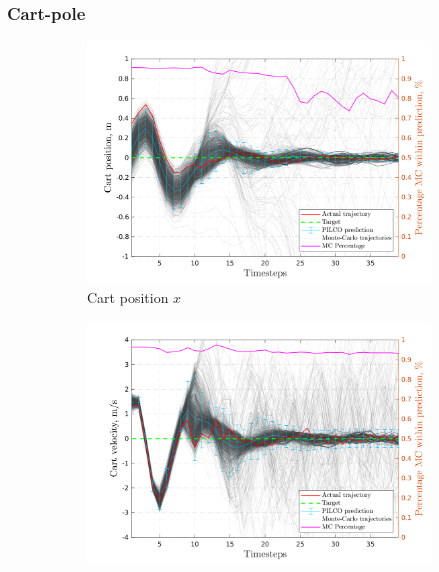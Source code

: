 \subsubsection{Cart-pole}
 \begin{figure}[htp!]    
   \begin{subfigure}[b]{1\linewidth}
    \centering
    \includegraphics[height=0.4\textheight,width=1\textwidth]{Chapter3/Figures/cp_MC_rollout_Ep_15_Dim_1.png} 
    \caption{Cart position $x$} 
    \label{Fig:Re-cp-cart-position} 
  \end{subfigure} 
  \begin{subfigure}[b]{1\linewidth}
    \centering
    \includegraphics[height=0.4\textheight,width=1\textwidth]{Chapter3/Figures/cp_MC_rollout_Ep_15_Dim_2.png} 

\end{subfigure}
\end{figure}
